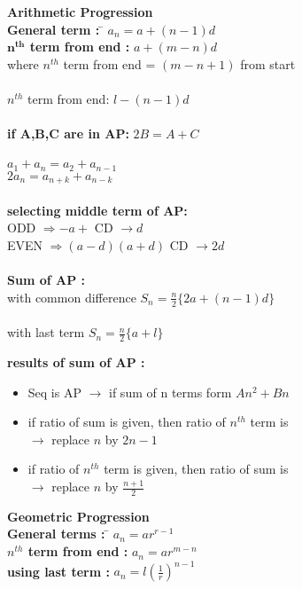 \documentclass[11pt,a4paper,landscape]{article}
\begin{document}
\begin{multicols}{3}

\begin{tabbing}
\textbf{\Large{Arithmetic Progression}}\\
\textbf{General term :} \hspace{10mm} \= $a_n = a+(n-1)d$ \\
\textbf{$\mathbf{n^{th}}$ term from  end  :} \> $a+(m-n)d$ \\
where $n^{th}$ term from  end = $(m-n+1)$ from start\\ \\
$n^{th}$ term from end: $l-(n-1)d$\\ \\

\textbf{if A,B,C are in AP:}
$2B=A+C$\\ \\
$a_1 + a_n = a_2 + a_{n-1}$\\
$2a_n = a_{n+k} + a_{n-k}$\\  \\

\textbf{selecting middle term of AP:} \\
ODD $\Rightarrow - a +$  \> CD $\rightarrow d$\\
EVEN $\Rightarrow (a-d)(a+d)$  \> CD $\rightarrow 2d$\\ \\

\textbf{Sum of AP :} \\
with common difference \> $S_n = \frac{n}{2}\{2a+(n-1)d\}$\\ \\ 
with last term \> $S_n = \frac{n}{2}\{a+l\}$
\end{tabbing}

\textbf{\noindent results of sum of AP :} 
\begin{itemize}
  	\item Seq is AP $\rightarrow$ if sum of n terms form $An^{2}+Bn$
	\item if ratio of sum is given, then ratio of $n^{th}$ term is \\ $\rightarrow$ replace $n$ by $2n-1$
	\item if ratio of $n^{th}$ term is given, then ratio of sum is \\ $\rightarrow$ replace $n$ by $\displaystyle \frac{n+1}{2}$
\\
\end{itemize}

\begin{tabbing}
{\bfseries {\Large Geometric Progression}}\\
{\bfseries General terms  :} \hspace{10mm} \= $a_n = ar^{r-1}$ \\
{\bfseries $n^{th}$ term from  end  :} \> $a_n = ar^{m-n}$ \\
{\bfseries using last term  :} \> $\displaystyle a_n= l \left({\frac{1}{r}} \right)^{n-1}$\\
\end{tabbing}


\end{multicols}
\end{document}
